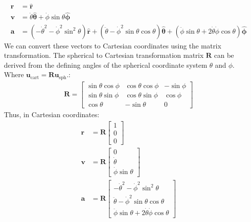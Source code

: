 \documentclass[letterpaper,11pt,english]{sphinxmanual}
\begin{document}
\begin{equation*}
\begin{split}\mathbf{r} &= \mathbf{\hat r} \\
\mathbf{v} &=  \dot\theta \hat{\boldsymbol\theta } + \dot\phi \sin\theta \mathbf{\hat{\boldsymbol\phi}} \\
\mathbf{a} &= \left(-\dot\theta^2 - \dot\phi^2\sin^2\theta \right) \mathbf{\hat r} + \left(\ddot\theta - \dot\phi^2\sin\theta\cos\theta \right) \hat{\boldsymbol\theta } + \left(\ddot\phi\sin\theta  + 2 \dot\theta\dot\phi\cos\theta \right) \hat{\boldsymbol\phi}\end{split}
\end{equation*}
\sphinxAtStartPar
We can convert these vectors to Cartesian coordinates using the matrix
transformation. The spherical to Cartesian transformation matrix
\(\mathbf{R}\) can be derived from the defining angles of the spherical
coordinate system \(\theta\) and \(\phi\). Where
\(\mathbf{u}_\text{cart} = \mathbf{R} \mathbf{u}_\text{sph}\).:
\begin{equation*}
\begin{split}\mathbf{R} = \begin{bmatrix}
\sin\theta\cos\phi & \cos\theta\cos\phi & -\sin\phi \\
\sin\theta\sin\phi & \cos\theta\sin\phi &  \cos\phi \\
\cos\theta         & -\sin\theta        & 0
\end{bmatrix}\end{split}
\end{equation*}
\sphinxAtStartPar
Thus, in Cartesian coordinates:
\begin{equation*}
\begin{split}\mathbf{r} &= \mathbf{R} \begin{bmatrix} 1 \\ 0 \\ 0 \end{bmatrix} \\
\mathbf{v} &= \mathbf{R} \begin{bmatrix} 0 \\ \dot\theta \\ \dot\phi \sin\theta \end{bmatrix} \\
\mathbf{a} &= \mathbf{R} \begin{bmatrix} -\dot\theta^2 - \dot\phi^2\sin^2\theta \\ \ddot\theta - \dot\phi^2\sin\theta\cos\theta \\ \ddot\phi\sin\theta  + 2 \dot\theta\dot\phi\cos\theta \end{bmatrix}\end{split}
\end{equation*}
\end{document}
